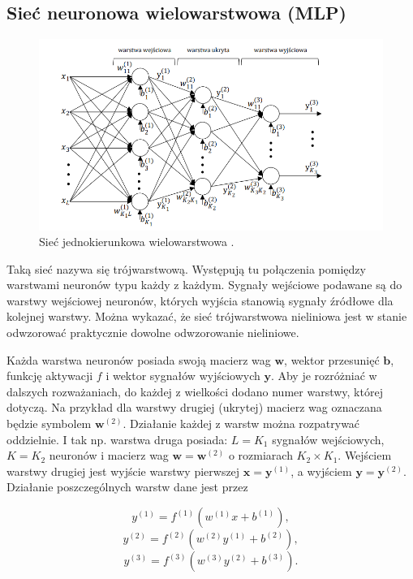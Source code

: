 \documentclass[a4paper,12pt]{article}
\begin{document}
\subsection{Sieć neuronowa wielowarstwowa (MLP)}

\begin{figure}[h!]
    \centering
    \includegraphics[width=1\linewidth]{MLP.png}
    \caption{Sieć jednokierunkowa wielowarstwowa \cite{RZajdelMLP}.}
\end{figure}

Taką sieć nazywa się trójwarstwową. Występują tu połączenia pomiędzy warstwami neuronów typu każdy z każdym.  
Sygnały wejściowe podawane są do warstwy wejściowej neuronów, których wyjścia stanowią sygnały źródłowe dla kolejnej warstwy.  
Można wykazać, że sieć trójwarstwowa nieliniowa jest w stanie odwzorować praktycznie dowolne odwzorowanie nieliniowe.

Każda warstwa neuronów posiada swoją macierz wag \(\mathbf{w}\), wektor przesunięć \(\mathbf{b}\), funkcję aktywacji \(f\) i wektor sygnałów wyjściowych \(\mathbf{y}\).  
Aby je rozróżniać w dalszych rozważaniach, do każdej z wielkości dodano numer warstwy, której dotyczą.  
Na przykład dla warstwy drugiej (ukrytej) macierz wag oznaczana będzie symbolem \(\mathbf{w}^{(2)}\).  
Działanie każdej z warstw można rozpatrywać oddzielnie.  
I tak np. warstwa druga posiada: \(L = K_1\) sygnałów wejściowych, \(K = K_2\) neuronów i macierz wag \(\mathbf{w} = \mathbf{w}^{(2)}\) o rozmiarach \(K_2 \times K_1\).  
Wejściem warstwy drugiej jest wyjście warstwy pierwszej \(\mathbf{x} = \mathbf{y}^{(1)}\), a wyjściem \(\mathbf{y} = \mathbf{y}^{(2)}\).  
Działanie poszczególnych warstw dane jest przez

\begin{equation}
y^{(1)} = f^{(1)}\left(w^{(1)}x + b^{(1)}\right), 
\end{equation}
\begin{equation}
y^{(2)} = f^{(2)}\left(w^{(2)}y^{(1)} + b^{(2)}\right), 
\end{equation}
\begin{equation}
y^{(3)} = f^{(3)}\left(w^{(3)}y^{(2)} + b^{(3)}\right).
\end{equation} 
\end{document}
